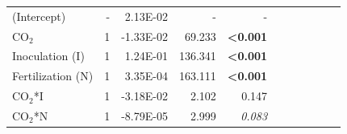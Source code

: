 \begin{landscape}
\begin{table}[]
{\begin{tabular}{p{3cm}p{0.5cm}p{1.75cm}p{1.5cm}p{1.5cm}p{1.75cm}p{1.5cm}p{1.5cm}p{1.75cm}p{1.5cm}p{1.5cm}}
            (Intercept) & \multicolumn{1}{r}{-}
            & \multicolumn{1}{r}{2.13E-02}  & \multicolumn{1}{r}{-}         & \multicolumn{1}{r}{-}
            & \multicolumn{1}{r}{}          & \multicolumn{1}{r}{}          & \multicolumn{1}{r}{}
            & \multicolumn{1}{r}{}          & \multicolumn{1}{r}{}          & \multicolumn{1}{r}{}
            \\

            CO$_2$ & \multicolumn{1}{r}{1}
            & \multicolumn{1}{r}{-1.33E-02} & \multicolumn{1}{r}{ 69.233}   & \multicolumn{1}{r}{\textbf{<0.001}}
            & \multicolumn{1}{r}{}          & \multicolumn{1}{r}{}          & \multicolumn{1}{r}{}
            & \multicolumn{1}{r}{}          & \multicolumn{1}{r}{}          & \multicolumn{1}{r}{} 
            \\


            Inoculation (I) & \multicolumn{1}{r}{1}
            & \multicolumn{1}{r}{1.24E-01}  & \multicolumn{1}{r}{136.341}   & \multicolumn{1}{r}{\textbf{<0.001}}
            & \multicolumn{1}{r}{}          & \multicolumn{1}{r}{}          & \multicolumn{1}{r}{}
            & \multicolumn{1}{r}{}          & \multicolumn{1}{r}{}          & \multicolumn{1}{r}{} 
            \\

            Fertilization (N) & \multicolumn{1}{r}{1}
            & \multicolumn{1}{r}{3.35E-04}  & \multicolumn{1}{r}{163.111}   & \multicolumn{1}{r}{\textbf{<0.001}}
            & \multicolumn{1}{r}{}          & \multicolumn{1}{r}{}          & \multicolumn{1}{r}{}
            & \multicolumn{1}{r}{}          & \multicolumn{1}{r}{}          & \multicolumn{1}{r}{} 
            \\

            CO$_2$*I & \multicolumn{1}{r}{1}
            & \multicolumn{1}{r}{-3.18E-02} & \multicolumn{1}{r}{  2.102}   & \multicolumn{1}{r}{0.147}
            & \multicolumn{1}{r}{}          & \multicolumn{1}{r}{}          & \multicolumn{1}{r}{}
            & \multicolumn{1}{r}{}          & \multicolumn{1}{r}{}          & \multicolumn{1}{r}{} 
            \\

            CO$_2$*N & \multicolumn{1}{r}{1}
            & \multicolumn{1}{r}{-8.79E-05} & \multicolumn{1}{r}{  2.999}   & \multicolumn{1}{r}{\textit{0.083}}
            & \multicolumn{1}{r}{}          & \multicolumn{1}{r}{}          & \multicolumn{1}{r}{}
            & \multicolumn{1}{r}{}          & \multicolumn{1}{r}{}          & \multicolumn{1}{r}{} 
            \\


\end{tabular}}
\end{table}
\end{landscape}
